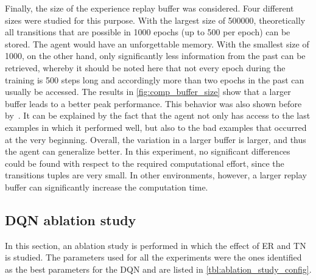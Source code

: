 \documentclass{article}
\begin{document}
Finally, the size of the experience replay buffer was considered. 
Four different sizes were studied for this purpose. 
With the largest size of 500000, theoretically all transitions that are possible in 1000 epochs (up to 500 per epoch) can be stored. 
The agent would have an unforgettable memory. 
With the smallest size of 1000, on the other hand, only significantly less information from the past can be retrieved, whereby it should be noted here that not every epoch during the training is 500 steps long and accordingly more than two epochs in the past can usually be accessed. 
The results in \autoref{fig:comp_buffer_size} show that a larger buffer leads to a better peak performance. 
This behavior was also shown before by~\cite{DBLP:conf/icml/FedusRABLRD20}. 
It can be explained by the fact that the agent not only has access to the last examples in which it performed well, but also to the bad examples that occurred at the very beginning. Overall, the variation in a larger buffer is larger, and thus the agent can generalize better. 
In this experiment, no significant differences could be found with respect to the required computational effort, since the transitions tuples are very small. In other environments, however, a larger replay buffer can significantly increase the computation time.


\subsection{DQN ablation study}
\label{subsec:dqn-ablation-study}
In this section, an ablation study is performed in which the effect of ER and TN is studied. 
The parameters used for all the experiments were the ones identified as the best parameters for the DQN and are listed in \autoref{tbl:ablation_study_config}.
\end{document}
